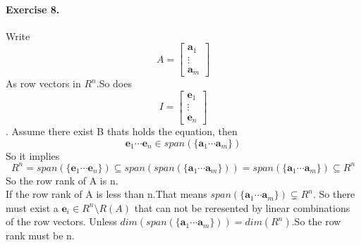 \documentclass{article}
\begin{document}
\paragraph{Exercise 8.}
    Write \[
    A=\begin{bmatrix}
        \mathbf{a}_1\\
        \vdots\\
        \mathbf{a}_m
    \end{bmatrix}
    \]As row vectors in $R^n$.So does \[
    I=\begin{bmatrix}
    \mathbf{e}_1\\
    \vdots\\
    \mathbf{e}_n
    \end{bmatrix}
    \].
    Assume there exist B thats holds the equation, then
    \[
    \mathbf{e}_1 \cdots \mathbf{e}_n \in span(\{\mathbf{a}_1 \cdots \mathbf{a}_m\})
    \]
    So it implies
    \[
    R^n=span(\{ \mathbf{e}_1\cdots \mathbf{e}_n\}) \subseteq span(span(\{\mathbf{a}_1 \cdots \mathbf{a}_m\}))=span(\{\mathbf{a}_1 \cdots \mathbf{a}_m\}) \subseteq R^n
    \]
    So the row rank of A is n.\\

    If the row rank of A is less than n.That means $span(\{\mathbf{a}_1 \cdots \mathbf{a}_m\}) \subsetneq R^n$. So there must exist a $\mathbf{e}_i \in R^n \setminus R(A)$ that can not be reresented by linear combinations of the row vectors.
    Unless $dim(span(\{\mathbf{a}_1 \cdots \mathbf{a}_m\}))=dim(R^n)$.So the row rank must be n.
\end{document}
